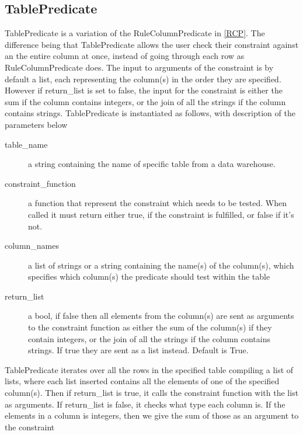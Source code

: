 \subsection{TablePredicate}
TablePredicate is a variation of the RuleColumnPredicate in \cref{RCP}. The difference being that TablePredicate allows the user check their constraint against an the entire column at once, instead of going through each row as RuleColumnPredicate does. The input to arguments of the constraint is by default a list, each representing the column(s) in the order they are specified. However if return\_list is set to false, the input for the constraint is either the sum if the column contains integers, or the join of all the strings if the column contains strings. TablePredicate is instantiated as follows, with description of the parameters below


\begin{description}
\item [table\_name] a string containing the name of specific table from a data warehouse. 
\item [constraint\_function] a function that represent the constraint which needs to be tested. When called it must return either true, if the constraint is fulfilled, or false if it's not.
\item [column\_names] a list of strings or a string containing the name(s) of the column(s), which specifies which column(s) the predicate should test within the table
\item [return\_list] a bool, if false then all elements from the column(s) are sent as arguments to the constraint function as either the sum of the column(s) if they contain integers, or the join of all the strings if the column contains strings. If true they are sent as a list instead. Default is True.
\end{description}

TablePredicate iterates over all the rows in the specified table compiling a list of lists, where each list inserted contains all the elements of one of the specified column(s). Then if return\_list is true, it calls the constraint function with the list as arguments. If return\_list is false, it checks what type each column is. If the elements in a column is integers, then we give the sum of those as an argument to the constraint
